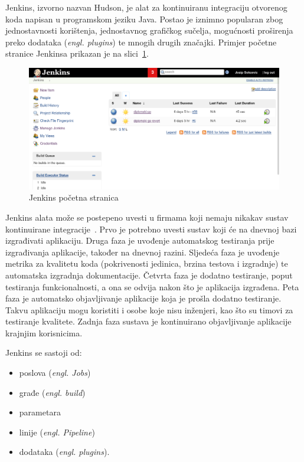 Jenkins, izvorno nazvan Hudson, je alat za kontinuiranu integraciju otvorenog koda napisan u
programskom jeziku Java. Postao je iznimno popularan zbog jednostavnosti korištenja, jednostavnog
grafičkog sučelja, mogućnosti proširenja preko dodataka (\textit{engl. plugins}) te mnogih drugih
značajki. Primjer početne stranice Jenkinsa prikazan je na slici~\ref{fig:02jenkins_home}.

\begin{figure}[h]
    \centering
    \includegraphics[width=\textwidth]{img/02/jenkins_home.png}
    \caption{Jenkins početna stranica}%
    \label{fig:02jenkins_home}
\end{figure}

Jenkins alata može se postepeno uvesti u firmama koji nemaju nikakav sustav kontinuirane
integracije~\citep{smart2011jenkins}. Prvo je potrebno uvesti sustav koji će na dnevnoj bazi
izgrađivati aplikaciju. Druga faza je uvođenje automatskog testiranja prije izgrađivanja aplikacije,
također na dnevnoj razini. Sljedeća faza je uvođenje metrika za kvalitetu koda (pokrivenosti
jedinica, brzina testova i izgradnje) te automatska izgradnja dokumentacije. Četvrta faza je dodatno
testiranje, poput testiranja funkcionalnosti, a ona se odvija nakon što je aplikacija izgrađena.
Peta faza je automatsko objavljivanje aplikacije koja je prošla dodatno testiranje. Takvu
aplikaciju mogu koristiti i osobe koje nisu inženjeri, kao što su timovi za testiranje kvalitete.
Zadnja faza sustava je kontinuirano objavljivanje aplikacije krajnjim korisnicima.

Jenkins se sastoji od:
\begin{itemize}
    \item poslova (\textit{engl. Jobs})
    \item građe (\textit{engl. build})
    \item parametara
    \item linije (\textit{engl. Pipeline})
    \item dodataka (\textit{engl. plugins}).
\end{itemize}

